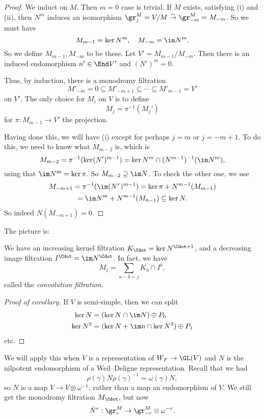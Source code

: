\documentclass[a4paper]{article}
\begin{document}
\begin{proof}
  We induct on $M$. Then $m = 0$ case is trivial. If $M$ exists, satisfying (i) and (ii), then $N^m$ induces an isomorphism $\gr_j^M = V/M \overset{\sim}{\to} \gr_{-m}^M = M_{-m}$. So we must have
  \[
    M_{m - 1} = \ker N^m,\quad M_{-m} = \im N^m.
  \]
  So we define $M_{m - 1}, M_{-m}$ to be these. Let $V' = M_{m - 1}/M_{-m}$. Then there is an induced endomorphism $n' \in \End V'$ and $(N')^m = 0$.

  Thus, by induction, there is a monodromy filtration
  \[
    M'_{-m} = 0 \subseteq M'_{-m + 1} \subseteq \cdots \subseteq M'_{m - 1} = V'
  \]
  on $V'$. The only choice for $M_i$ on $V$ is to define
  \[
    M_j = \pi^{-1}(M_j')
  \]
  for $\pi: M_{m - 1} \to V'$ the projection.

  Having done this, we will have (i) except for perhaps $j = m$ or $j = -m + 1$. To do this, we need to know what $M_{m - 2}$ is, which is
  \[
    M_{m - 2} = \pi^{-1}(\ker (N')^{m - 1}) = \ker N^m \cap (N^{m - 1})^{-1} (\im N^m),
  \]
  using that $\im N^m = \ker \pi$. So $M_{m - 2} \supseteq \im N$. To check the other one, we use
  \begin{multline*}
    M_{-m + 1} = \pi^{-1}(\im(N^r)^{m- 1}) = \ker \pi + N^{m - 1}(M_{m- 1}) \\
    = \im N^m + N^{m - 1}(M_{n - 1}) \subseteq \ker N.
  \end{multline*}
  So indeed $N(M_{-m + 1}) = 0$. %
\end{proof}

The picture is:


We have an increasing kernel filtration $K_{\Cdot} = \ker N^{\Cdot + 1}$, and a decreasing image filtration $I^\Cdot = \im N^\Cdot$. In fact, we have
\[
  M_j = \sum_{a - b = j} K_a \cap I^b,
\]
called the \emph{convolution filtration}.
\begin{proof}[Proof of corollary]
  If $V$ is semi-simple, then we can split
  \begin{align*}
    \ker N &= (\ker N \cap \im N) \oplus P_0\\
    \ker N^2 &= (\ker N + \im n \cap \ker N^2) \oplus P_1
  \end{align*}
  etc. %
\end{proof}
We will apply this when $V$ is a representation of $W_F \to \GL(V)$ and $N$ is the nilpotent endomorphism of a Weil--Deligne representation. Recall that we had
\[
  \rho(\gamma) N \rho(\gamma)^{-1} = \omega(\gamma) N,
\]
so $N$ is a map $V \to V \otimes \omega^{-1}$, rather than a map an endomorphism of $V$. We still get the monodromy filtration $M_{\Cdot}$, but now
\[
  \bar{N}^r: \gr_r^M \to \gr_{-r}^M \otimes \omega^{-r}.
\]
\end{document}
